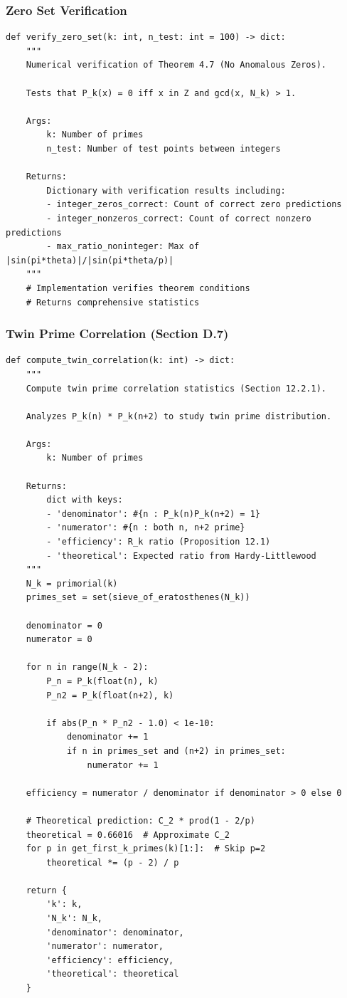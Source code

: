 ﻿\documentclass[12pt,a4paper]{report}
\theoremstyle{plain}
\theoremstyle{definition}
\begin{document}
\subsubsection*{Zero Set Verification}

\begin{verbatim}
def verify_zero_set(k: int, n_test: int = 100) -> dict:
    """
    Numerical verification of Theorem 4.7 (No Anomalous Zeros).
    
    Tests that P_k(x) = 0 iff x in Z and gcd(x, N_k) > 1.
    
    Args:
        k: Number of primes
        n_test: Number of test points between integers
        
    Returns:
        Dictionary with verification results including:
        - integer_zeros_correct: Count of correct zero predictions
        - integer_nonzeros_correct: Count of correct nonzero predictions
        - max_ratio_noninteger: Max of |sin(pi*theta)|/|sin(pi*theta/p)|
    """
    # Implementation verifies theorem conditions
    # Returns comprehensive statistics
\end{verbatim}

\subsubsection*{Twin Prime Correlation (Section D.7)}

\begin{verbatim}
def compute_twin_correlation(k: int) -> dict:
    """
    Compute twin prime correlation statistics (Section 12.2.1).
    
    Analyzes P_k(n) * P_k(n+2) to study twin prime distribution.
    
    Args:
        k: Number of primes
        
    Returns:
        dict with keys:
        - 'denominator': #{n : P_k(n)P_k(n+2) = 1}
        - 'numerator': #{n : both n, n+2 prime}
        - 'efficiency': R_k ratio (Proposition 12.1)
        - 'theoretical': Expected ratio from Hardy-Littlewood
    """
    N_k = primorial(k)
    primes_set = set(sieve_of_eratosthenes(N_k))
    
    denominator = 0
    numerator = 0
    
    for n in range(N_k - 2):
        P_n = P_k(float(n), k)
        P_n2 = P_k(float(n+2), k)
        
        if abs(P_n * P_n2 - 1.0) < 1e-10:
            denominator += 1
            if n in primes_set and (n+2) in primes_set:
                numerator += 1
    
    efficiency = numerator / denominator if denominator > 0 else 0
    
    # Theoretical prediction: C_2 * prod(1 - 2/p)
    theoretical = 0.66016  # Approximate C_2
    for p in get_first_k_primes(k)[1:]:  # Skip p=2
        theoretical *= (p - 2) / p
    
    return {
        'k': k,
        'N_k': N_k,
        'denominator': denominator,
        'numerator': numerator,
        'efficiency': efficiency,
        'theoretical': theoretical
    }
\end{verbatim}
\end{document}
